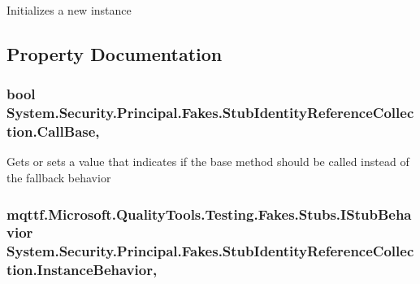 Initializes a new instance



\subsection{Property Documentation}
\hypertarget{class_system_1_1_security_1_1_principal_1_1_fakes_1_1_stub_identity_reference_collection_a79581ea8273c676a7ca7b9b44ac4f7f0}{
\subsubsection[{Call\-Base}]{\setlength{\rightskip}{0pt plus 5cm}bool System.\-Security.\-Principal.\-Fakes.\-Stub\-Identity\-Reference\-Collection.\-Call\-Base\hspace{0.3cm}{\ttfamily [get]}, {\ttfamily [set]}}}\label{class_system_1_1_security_1_1_principal_1_1_fakes_1_1_stub_identity_reference_collection_a79581ea8273c676a7ca7b9b44ac4f7f0}


Gets or sets a value that indicates if the base method should be called instead of the fallback behavior

\hypertarget{class_system_1_1_security_1_1_principal_1_1_fakes_1_1_stub_identity_reference_collection_a850de7cd8666cb4eb1172f098e484a8c}{
\subsubsection[{Instance\-Behavior}]{\setlength{\rightskip}{0pt plus 5cm}mqttf.\-Microsoft.\-Quality\-Tools.\-Testing.\-Fakes.\-Stubs.\-I\-Stub\-Behavior System.\-Security.\-Principal.\-Fakes.\-Stub\-Identity\-Reference\-Collection.\-Instance\-Behavior\hspace{0.3cm}{\ttfamily [get]}, {\ttfamily [set]}}}\label{class_system_1_1_security_1_1_principal_1_1_fakes_1_1_stub_identity_reference_collection_a850de7cd8666cb4eb1172f098e484a8c}


